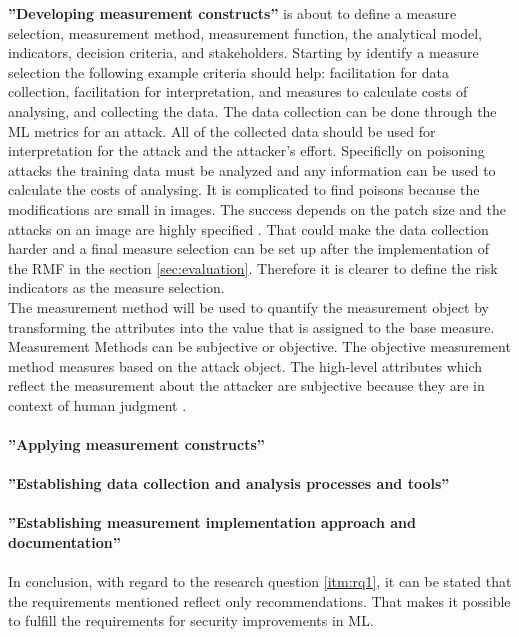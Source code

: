 \textbf{''Developing measurement constructs''} is about to define a measure selection, measurement method, measurement function, the analytical model, indicators, decision criteria, and stakeholders. Starting by identify a measure selection the following example criteria should help: facilitation for data collection, facilitation for interpretation, and measures to calculate costs of analysing, and collecting the data. The data collection can be done through the ML metrics for an attack. All of the collected data should be used for interpretation for the attack and the attacker's effort. Specificlly on poisoning attacks the training data must be analyzed and any information can be used to calculate the costs of analysing. It is complicated to find poisons because the modifications are small in images. The success depends on the patch size and the attacks on an image are highly specified \cite{DBLP:conf/icml/SchwarzschildGG21}. That could make the data collection harder and a final measure selection can be set up after the implementation of the RMF in the section \ref{sec:evaluation}. Therefore it is clearer to define the risk indicators as the measure selection. \\ The measurement method will be used to quantify the measurement object by transforming the attributes into the value that is assigned to the base measure. Measurement Methods can be subjective or objective. The objective measurement method measures based on the attack object. The high-level attributes which reflect the measurement about the attacker are subjective because they are in context of human judgment \cite{DBLP:conf/crisis/DoynikovaNGK20}. \\ \\

\textbf{''Applying measurement constructs''} \\ \\

\textbf{''Establishing data collection and analysis processes and tools''} \\ \\

\textbf{''Establishing measurement implementation approach and documentation''} \\ \\

In conclusion, with regard to the research question \ref{itm:rq1}, it can be stated that the requirements mentioned reflect only recommendations. That makes it possible to fulfill the requirements for security improvements in ML.

